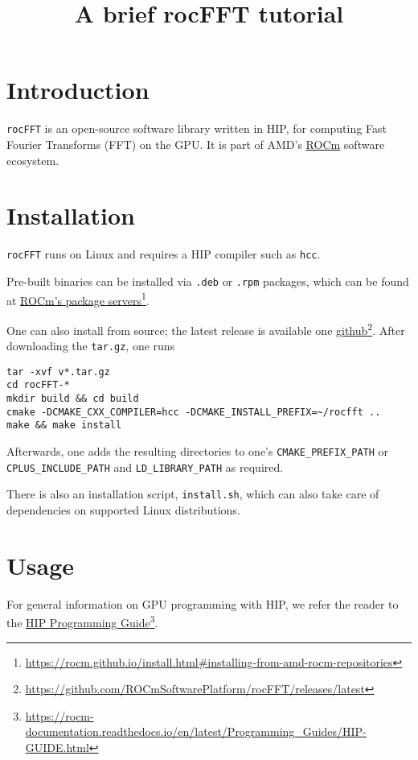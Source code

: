 \documentclass[10pt]{article}
\title{A brief rocFFT tutorial}
\date{}
\renewcommand{\(}{\left(}
\renewcommand{\)}{\right)}
\begin{document}
\maketitle

\section{Introduction}

\texttt{rocFFT} is an open-source software library written in HIP, for
computing Fast Fourier Transforms (FFT) on the GPU. It is part of
AMD's \href{https://github.com/RadeonOpenCompute}{ROCm} software
ecosystem.

\section{Installation}

\texttt{rocFFT} runs on Linux and requires a HIP compiler such as
\texttt{hcc}.

Pre-built binaries can be installed via \texttt{.deb} or \texttt{.rpm}
packages, which can be found at
\href{https://rocm.github.io/install.html#installing-from-amd-rocm-repositories}{ROCm's
  package servers}\footnote{\url{https://rocm.github.io/install.html\#installing-from-amd-rocm-repositories}}.

One can also install from source; the latest release is available one
\href{https://github.com/ROCmSoftwarePlatform/rocFFT/releases/latest}{github}\footnote{\url{https://github.com/ROCmSoftwarePlatform/rocFFT/releases/latest}}.
After downloading the \texttt{tar.gz}, one runs
\begin{verbatim}
tar -xvf v*.tar.gz
cd rocFFT-*
mkdir build && cd build
cmake -DCMAKE_CXX_COMPILER=hcc -DCMAKE_INSTALL_PREFIX=~/rocfft ..
make && make install
\end{verbatim}
Afterwards, one adds the resulting directories to one's
\texttt{CMAKE_PREFIX_PATH} or \texttt{CPLUS_INCLUDE_PATH} and
\texttt{LD_LIBRARY_PATH} as required.

There is also an installation script, \texttt{install.sh}, which can
also take care of dependencies on supported Linux distributions.

\section{Usage}

For general information on GPU programming with HIP, we refer the
reader to the
\href{https://rocm-documentation.readthedocs.io/en/latest/Programming_Guides/HIP-GUIDE.html}{HIP
  Programming
  Guide}\footnote{\url{https://rocm-documentation.readthedocs.io/en/latest/Programming_Guides/HIP-GUIDE.html}}.
\end{document}
